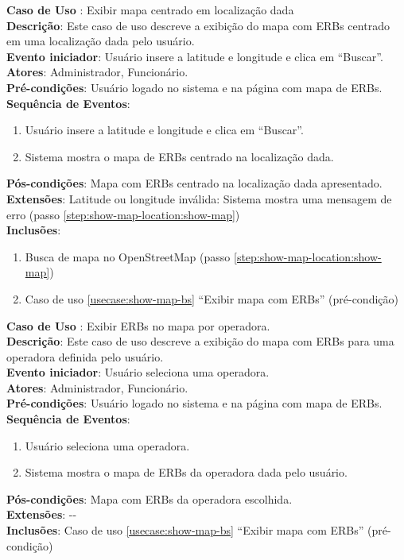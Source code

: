 \documentclass[]{politex}
\begin{document}
\noindent \textbf{Caso de Uso }: Exibir mapa centrado em localização dada \\
\textbf{Descrição}: Este caso de uso descreve a exibição do mapa com ERBs
centrado em uma localização dada pelo usuário.  \\
\textbf{Evento iniciador}: Usuário insere a latitude e longitude e clica em ``Buscar''. \\
\textbf{Atores}: Administrador, Funcionário. \\
\textbf{Pré-condições}: Usuário logado no sistema e na página com mapa de ERBs. \\
\textbf{Sequência de Eventos}:
\begin{enumerate}
\item Usuário insere a latitude e longitude e clica em ``Buscar''.
\item\label{step:show-map-location:show-map} Sistema mostra o mapa de ERBs centrado na localização dada.
\end{enumerate}
\textbf{Pós-condições}: Mapa com ERBs centrado na localização dada apresentado. \\
\textbf{Extensões}: Latitude ou longitude inválida: Sistema mostra uma mensagem de erro (passo \ref{step:show-map-location:show-map}) \\
\textbf{Inclusões}:
\begin{enumerate}
\item Busca de mapa no OpenStreetMap (passo \ref{step:show-map-location:show-map})
\item Caso de uso \ref{usecase:show-map-bs} ``Exibir mapa com ERBs'' (pré-condição)
\end{enumerate}

\noindent \textbf{Caso de Uso }: Exibir ERBs no mapa por operadora. \\
\textbf{Descrição}: Este caso de uso descreve a exibição do mapa com ERBs para
uma operadora definida pelo usuário. \\
\textbf{Evento iniciador}: Usuário seleciona uma operadora. \\
\textbf{Atores}: Administrador, Funcionário. \\
\textbf{Pré-condições}: Usuário logado no sistema e na página com mapa de ERBs. \\
\textbf{Sequência de Eventos}:
\begin{enumerate}
\item Usuário seleciona uma operadora.
\item Sistema mostra o mapa de ERBs da operadora dada pelo usuário.
\end{enumerate}
\textbf{Pós-condições}: Mapa com ERBs da operadora escolhida. \\
\textbf{Extensões}: -{}- \\
\textbf{Inclusões}: Caso de uso \ref{usecase:show-map-bs} ``Exibir mapa com ERBs'' (pré-condição) \\
\end{document}
